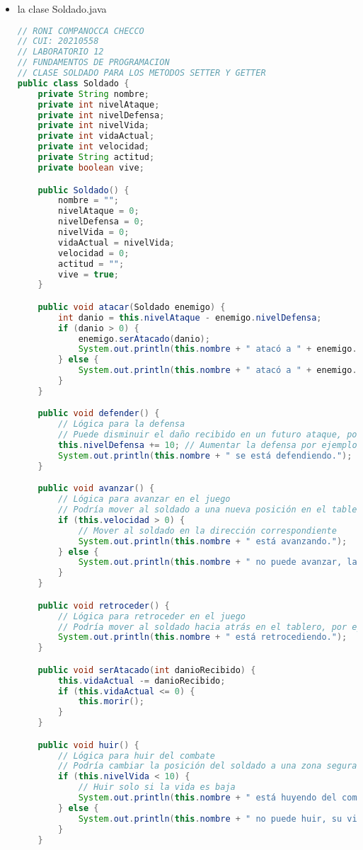 \documentclass{article}
\begin{document}
\begin{itemize}
        \item la clase Soldado.java
        \begin{lstlisting}[language=java]
// RONI COMPANOCCA CHECCO
// CUI: 20210558
// LABORATORIO 12
// FUNDAMENTOS DE PROGRAMACION 
// CLASE SOLDADO PARA LOS METODOS SETTER Y GETTER
public class Soldado {
    private String nombre;
    private int nivelAtaque;
    private int nivelDefensa;
    private int nivelVida;
    private int vidaActual;
    private int velocidad;
    private String actitud;
    private boolean vive;

    public Soldado() {
        nombre = "";
        nivelAtaque = 0;
        nivelDefensa = 0;
        nivelVida = 0;
        vidaActual = nivelVida;
        velocidad = 0;
        actitud = "";
        vive = true;
    }

    public void atacar(Soldado enemigo) {
        int danio = this.nivelAtaque - enemigo.nivelDefensa;
        if (danio > 0) {
            enemigo.serAtacado(danio);
            System.out.println(this.nombre + " atacó a " + enemigo.nombre + " y le causó " + danio + " de daño.");
        } else {
            System.out.println(this.nombre + " atacó a " + enemigo.nombre + " pero no le causó daño.");
        }
    }

    public void defender() {
        // Lógica para la defensa
        // Puede disminuir el daño recibido en un futuro ataque, por ejemplo
        this.nivelDefensa += 10; // Aumentar la defensa por ejemplo
        System.out.println(this.nombre + " se está defendiendo.");
    }

    public void avanzar() {
        // Lógica para avanzar en el juego
        // Podría mover al soldado a una nueva posición en el tablero, por ejemplo
        if (this.velocidad > 0) {
            // Mover al soldado en la dirección correspondiente
            System.out.println(this.nombre + " está avanzando.");
        } else {
            System.out.println(this.nombre + " no puede avanzar, la velocidad es 0.");
        }
    }

    public void retroceder() {
        // Lógica para retroceder en el juego
        // Podría mover al soldado hacia atrás en el tablero, por ejemplo
        System.out.println(this.nombre + " está retrocediendo.");
    }

    public void serAtacado(int danioRecibido) {
        this.vidaActual -= danioRecibido;
        if (this.vidaActual <= 0) {
            this.morir();
        }
    }

    public void huir() {
        // Lógica para huir del combate
        // Podría cambiar la posición del soldado a una zona segura, por ejemplo
        if (this.nivelVida < 10) {
            // Huir solo si la vida es baja
            System.out.println(this.nombre + " está huyendo del combate.");
        } else {
            System.out.println(this.nombre + " no puede huir, su vida está alta.");
        }
    }


\end{lstlisting}
\end{itemize}
\end{document}
